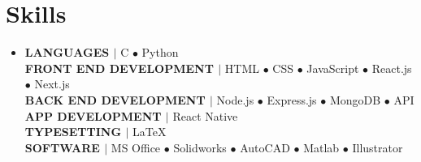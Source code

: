 \section{Skills}

\begin{itemize}[leftmargin=0.15in, label={}]
	\item{
		\textbf{LANGUAGES $|$ }{C $\bullet$ Python} \\
		\textbf{FRONT END DEVELOPMENT $|$ }{HTML $\bullet$ CSS $\bullet$ JavaScript $\bullet$ React.js $\bullet$ Next.js} \\
		\textbf{BACK END DEVELOPMENT $|$ }{Node.js $\bullet$ Express.js $\bullet$ MongoDB $\bullet$ API} \\
		\textbf{APP DEVELOPMENT $|$ }{React Native} \\
		\textbf{TYPESETTING $|$ }{\LaTeX}\\
		\textbf{SOFTWARE $|$ }{MS Office $\bullet$ Solidworks $\bullet$ AutoCAD $\bullet$ Matlab $\bullet$ Illustrator}
	}
\end{itemize}